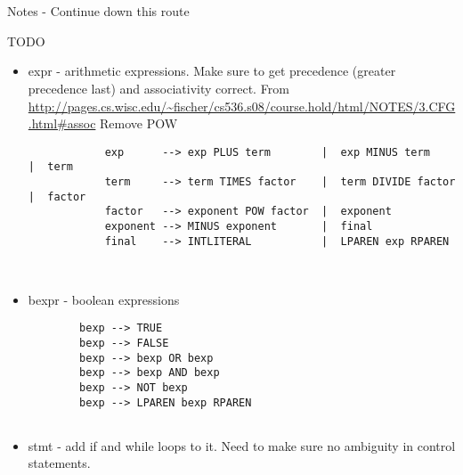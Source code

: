 \documentclass[12pt, letterpaper]{article}
\begin{document}
\newpage

	\hfill\\\hfill\\
	Notes - Continue down this route
	
	TODO
	\begin{itemize}
		\item expr - arithmetic expressions. Make sure to get precedence (greater precedence last) and associativity correct.
		From \url{http://pages.cs.wisc.edu/~fischer/cs536.s08/course.hold/html/NOTES/3.CFG.html#assoc} Remove POW
		\begin{verbatim}
			exp      --> exp PLUS term        |  exp MINUS term      |  term
			term     --> term TIMES factor    |  term DIVIDE factor  |  factor
			factor   --> exponent POW factor  |  exponent
			exponent --> MINUS exponent       |  final
			final    --> INTLITERAL           |  LPAREN exp RPAREN

		
		\end{verbatim}
		
		
		\item bexpr - boolean expressions
		
		\begin{verbatim}
		bexp --> TRUE
		bexp --> FALSE
		bexp --> bexp OR bexp
		bexp --> bexp AND bexp
		bexp --> NOT bexp
		bexp --> LPAREN bexp RPAREN
		
		\end{verbatim}
		\item  stmt - add if and while loops to it. Need to make sure no ambiguity in control statements. 
	\end{itemize}
\end{document}
